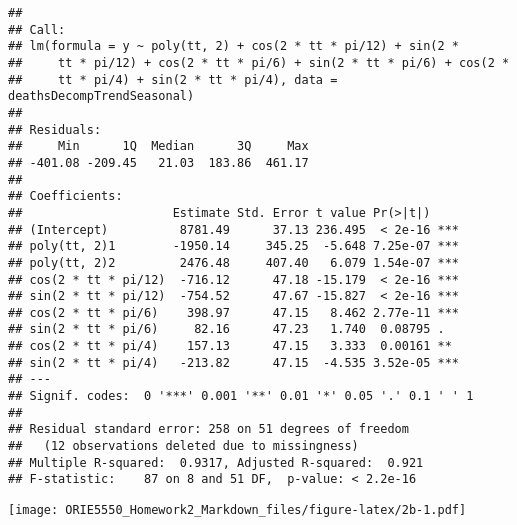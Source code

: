 \documentclass[
]{article}
\newenvironment{Shaded}{\begin{snugshade}}{\end{snugshade}}
\newcommand{\AttributeTok}[1]{\textcolor[rgb]{0.13,0.29,0.53}{#1}}
\newcommand{\DecValTok}[1]{\textcolor[rgb]{0.00,0.00,0.81}{#1}}
\newcommand{\FunctionTok}[1]{\textcolor[rgb]{0.13,0.29,0.53}{\textbf{#1}}}
\newcommand{\NormalTok}[1]{#1}
\newcommand{\SpecialCharTok}[1]{\textcolor[rgb]{0.81,0.36,0.00}{\textbf{#1}}}
\newcommand{\StringTok}[1]{\textcolor[rgb]{0.31,0.60,0.02}{#1}}
\begin{document}
\begin{verbatim}
## 
## Call:
## lm(formula = y ~ poly(tt, 2) + cos(2 * tt * pi/12) + sin(2 * 
##     tt * pi/12) + cos(2 * tt * pi/6) + sin(2 * tt * pi/6) + cos(2 * 
##     tt * pi/4) + sin(2 * tt * pi/4), data = deathsDecompTrendSeasonal)
## 
## Residuals:
##     Min      1Q  Median      3Q     Max 
## -401.08 -209.45   21.03  183.86  461.17 
## 
## Coefficients:
##                     Estimate Std. Error t value Pr(>|t|)    
## (Intercept)          8781.49      37.13 236.495  < 2e-16 ***
## poly(tt, 2)1        -1950.14     345.25  -5.648 7.25e-07 ***
## poly(tt, 2)2         2476.48     407.40   6.079 1.54e-07 ***
## cos(2 * tt * pi/12)  -716.12      47.18 -15.179  < 2e-16 ***
## sin(2 * tt * pi/12)  -754.52      47.67 -15.827  < 2e-16 ***
## cos(2 * tt * pi/6)    398.97      47.15   8.462 2.77e-11 ***
## sin(2 * tt * pi/6)     82.16      47.23   1.740  0.08795 .  
## cos(2 * tt * pi/4)    157.13      47.15   3.333  0.00161 ** 
## sin(2 * tt * pi/4)   -213.82      47.15  -4.535 3.52e-05 ***
## ---
## Signif. codes:  0 '***' 0.001 '**' 0.01 '*' 0.05 '.' 0.1 ' ' 1
## 
## Residual standard error: 258 on 51 degrees of freedom
##   (12 observations deleted due to missingness)
## Multiple R-squared:  0.9317, Adjusted R-squared:  0.921 
## F-statistic:    87 on 8 and 51 DF,  p-value: < 2.2e-16
\end{verbatim}

\begin{Shaded}
\end{Shaded}

\texttt{[image: ORIE5550\_Homework2\_Markdown\_files/figure-latex/2b-1.pdf]}

\begin{Shaded}
\end{Shaded}
\end{document}
